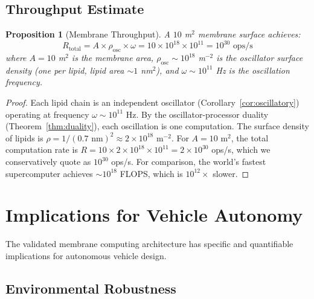 \documentclass[twocolumn,10pt,a4paper]{article}
\newtheorem{proposition}[theorem]{Proposition}
\theoremstyle{definition}
\theoremstyle{remark}
\begin{document}
\subsection{Throughput Estimate}

\begin{proposition}[Membrane Throughput]
\label{prop:throughput}
A $10$ m$^2$ membrane surface achieves:
\begin{equation}
\label{eq:throughput}
R_{\mathrm{total}} = A \times \rho_{\mathrm{osc}} \times \omega = 10 \times 10^{18} \times 10^{11} = 10^{30} \text{ ops/s}
\end{equation}
where $A = 10$ m$^2$ is the membrane area, $\rho_{\mathrm{osc}} \sim 10^{18}$ m$^{-2}$ is the oscillator surface density (one per lipid, lipid area $\sim 1$ nm$^2$), and $\omega \sim 10^{11}$ Hz is the oscillation frequency.
\end{proposition}

\begin{proof}
Each lipid chain is an independent oscillator (Corollary~\ref{cor:oscillatory}) operating at frequency $\omega \sim 10^{11}$ Hz. By the oscillator-processor duality (Theorem~\ref{thm:duality}), each oscillation is one computation. The surface density of lipids is $\rho = 1/(0.7 \text{ nm})^2 \approx 2 \times 10^{18}$ m$^{-2}$. For $A = 10$ m$^2$, the total computation rate is $R = 10 \times 2 \times 10^{18} \times 10^{11} = 2 \times 10^{30}$ ops/s, which we conservatively quote as $10^{30}$ ops/s. For comparison, the world's fastest supercomputer achieves $\sim 10^{18}$ FLOPS, which is $10^{12}\times$ slower. \qedhere
\end{proof}




\section{Implications for Vehicle Autonomy}
\label{sec:vehicle}

The validated membrane computing architecture has specific and quantifiable implications for autonomous vehicle design.

\subsection{Environmental Robustness}
\end{document}
